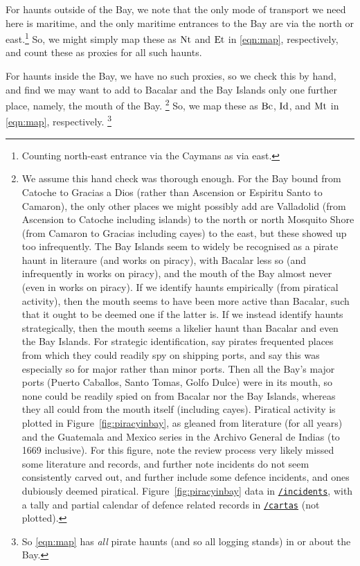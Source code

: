 		For haunts outside of the Bay, we note that the only mode of transport we need here is maritime, and the only maritime entrances to the Bay are via the north or east.\footnote{Counting north-east entrance via the Caymans as via east.} So, we might simply map these as \(\operatorname{Nt}\) and \(\operatorname{Et}\) in \ref{eqn:map}, respectively, and count these as proxies for all such haunts.
	
		For haunts inside the Bay, we have no such proxies, so we check this by hand, and find we may want to add to Bacalar and the Bay Islands only one further place, namely, the mouth of the Bay.%
		\footnote{We assume this hand check was thorough enough. For the Bay bound from Catoche to Gracias a Dios (rather than Ascension or Espiritu Santo to Camaron), the only other places we might possibly add are Valladolid (from Ascension to Catoche including islands) to the north or north Mosquito Shore (from Camaron to Gracias including cayes) to the east, but these showed up too infrequently. The Bay Islands seem to widely be recognised as a pirate haunt in literaure (and works on piracy), with Bacalar less so (and infrequently in works on piracy), and the mouth of the Bay almost never (even in works on piracy). If we identify haunts empirically (from piratical activity), then the mouth seems to have been more active than Bacalar, such that it ought to be deemed one if the latter is. If we instead identify haunts strategically, then the mouth seems a likelier haunt than Bacalar and even the Bay Islands. For strategic identification, say pirates frequented places from which they could readily spy on shipping ports, and say this was especially so for major rather than minor ports. Then all the Bay's major ports (Puerto Caballos, Santo Tomas, Golfo Dulce) were in its mouth, so none could be readily spied on from Bacalar nor the Bay Islands, whereas they all could from the mouth itself (including cayes). Piratical activity is plotted in Figure~\ref{fig:piracyinbay}, as gleaned from literature (for all years) and the Guatemala and Mexico series in the Archivo General de Indias (to 1669 inclusive). For this figure, note the review process very likely missed some literature and records, and further note incidents do not seem consistently carved out, and further include some defence incidents, and ones dubiously deemed piratical. Figure~\ref{fig:piracyinbay} data in \href{https://github.com/aenavidad/pp-0/tree/main/incidents}{\nolinkurl{/incidents}}, with a tally and partial calendar of defence related records in \href{https://github.com/aenavidad/pp-0/tree/main/cartas}{\nolinkurl{/cartas}} (not plotted).}
		So, we map these as \(\operatorname{Bc}\), \(\operatorname{Id}\), and \(\operatorname{Mt}\) in \ref{eqn:map}, respectively.%
		\footnote{So \ref{eqn:map} has \emph{all} pirate haunts (and so all logging stands) in or about the Bay.}
	
